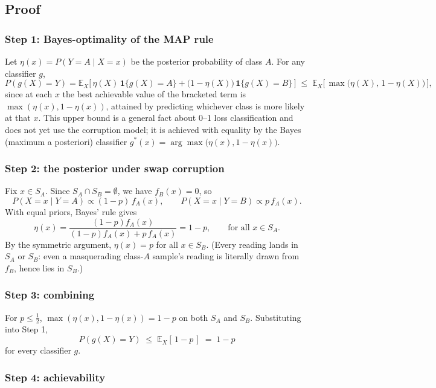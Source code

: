 \documentclass[11pt]{article}
\begin{document}
\subsection{Proof}

\subsubsection*{Step 1: Bayes-optimality of the MAP rule}

Let $\eta(x) = P(Y = A \mid X = x)$ be the posterior probability of class
$A$. For any classifier $g$,
\[
  P(g(X) = Y)
  = \mathbb{E}_X\Big[\, \eta(X)\,\mathbf{1}\{g(X) = A\}
    + \big(1-\eta(X)\big)\,\mathbf{1}\{g(X) = B\} \,\Big]
  \;\le\; \mathbb{E}_X\big[\, \max\big(\eta(X),\, 1-\eta(X)\big) \,\big],
\]
since at each $x$ the best achievable value of the bracketed term is
$\max(\eta(x), 1-\eta(x))$, attained by predicting whichever class is more
likely at that $x$. This upper bound is a general fact about 0--1 loss
classification and does not yet use the corruption model; it is achieved
with equality by the Bayes (maximum a posteriori) classifier
$g^\ast(x) = \arg\max\big(\eta(x), 1-\eta(x)\big)$.

\subsubsection*{Step 2: the posterior under swap corruption}

Fix $x \in S_A$. Since $S_A \cap S_B = \emptyset$, we have $f_B(x) = 0$, so
\[
  P(X = x \mid Y = A) \propto (1-p)\,f_A(x),
  \qquad
  P(X = x \mid Y = B) \propto p\,f_A(x).
\]
With equal priors, Bayes' rule gives
\[
  \eta(x) = \frac{(1-p)f_A(x)}{(1-p)f_A(x) + p\,f_A(x)} = 1 - p,
  \qquad \text{for all } x \in S_A.
\]
By the symmetric argument, $\eta(x) = p$ for all $x \in S_B$. (Every reading
lands in $S_A$ or $S_B$: even a masquerading class-$A$ sample's reading is
literally drawn from $f_B$, hence lies in $S_B$.)

\subsubsection*{Step 3: combining}

For $p \le \tfrac12$, $\max(\eta(x), 1-\eta(x)) = 1-p$ on both $S_A$ and
$S_B$. Substituting into Step 1,
\[
  P(g(X) = Y) \;\le\; \mathbb{E}_X[\,1-p\,] \;=\; 1-p
\]
for every classifier $g$.

\subsubsection*{Step 4: achievability}
\end{document}
